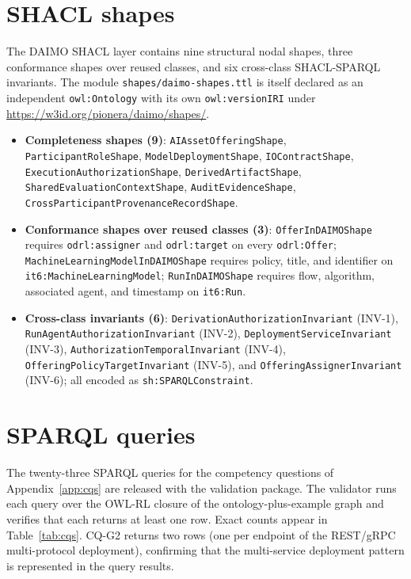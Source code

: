 \documentclass[11pt,a4paper]{article}
\newcommand{\code}[1]{\texttt{#1}}
\begin{document}
\section{SHACL shapes}\label{app:shapes}

The DAIMO SHACL layer contains nine structural nodal shapes, three conformance shapes over reused classes, and six cross-class SHACL-SPARQL invariants. The module \code{shapes/daimo-shapes.ttl} is itself declared as an independent \code{owl:Ontology} with its own \code{owl:versionIRI} under \url{https://w3id.org/pionera/daimo/shapes/}.

\begin{itemize}[leftmargin=*]
\item \textbf{Completeness shapes (9)}: \code{AIAssetOfferingShape}, \code{ParticipantRoleShape}, \code{ModelDeploymentShape}, \code{IOContractShape}, \code{ExecutionAuthorizationShape}, \code{DerivedArtifactShape}, \code{SharedEvaluationContextShape}, \code{AuditEvidenceShape}, \code{CrossParticipantProvenanceRecordShape}.
\item \textbf{Conformance shapes over reused classes (3)}: \code{OfferInDAIMOShape} requires \code{odrl:assigner} and \code{odrl:target} on every \code{odrl:Offer}; \code{MachineLearningModelInDAIMOShape} requires policy, title, and identifier on \code{it6:MachineLearningModel}; \code{RunInDAIMOShape} requires flow, algorithm, associated agent, and timestamp on \code{it6:Run}.
\item \textbf{Cross-class invariants (6)}: \code{DerivationAuthorizationInvariant} (INV-1), \code{RunAgentAuthorizationInvariant} (INV-2), \code{DeploymentServiceInvariant} (INV-3), \code{AuthorizationTemporalInvariant} (INV-4), \code{OfferingPolicyTargetInvariant} (INV-5), and \code{OfferingAssignerInvariant} (INV-6); all encoded as \code{sh:SPARQLConstraint}.
\end{itemize}

\section{SPARQL queries}\label{app:sparql}

The twenty-three SPARQL queries for the competency questions of Appendix~\ref{app:cqs} are released with the validation package. The validator runs each query over the OWL-RL closure of the ontology-plus-example graph and verifies that each returns at least one row. Exact counts appear in Table~\ref{tab:cqs}. CQ-G2 returns two rows (one per endpoint of the REST/gRPC multi-protocol deployment), confirming that the multi-service deployment pattern is represented in the query results.
\end{document}

